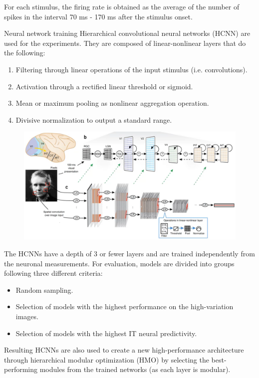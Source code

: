 \begin{casestudy}
\begin{descriptionlist}
            For each stimulus, the firing rate is obtained as the average of the number of spikes in the interval 70 ms - 170 ms after the stimulus onset.


        \item[Neural network training] 
            Hierarchical convolutional neural networks (HCNN) are used for the experiments.
            They are composed of linear-nonlinear layers that do the following:
            \begin{enumerate}
                \item Filtering through linear operations of the input stimulus (i.e. convolutions).
                \item Activation through a rectified linear threshold or sigmoid.
                \item Mean or maximum pooling as nonlinear aggregation operation.
                \item Divisive normalization to output a standard range.
            \end{enumerate}
            \begin{figure}[H]
                \centering
                \includegraphics[width=0.7\linewidth]{./img/vision_nn_network.png}
            \end{figure}

            The HCNNs have a depth of 3 or fewer layers and are trained independently from the neuronal measurements.
            For evaluation, models are divided into groups following three different criteria:
            \begin{itemize}
                \item Random sampling.
                \item Selection of models with the highest performance on the high-variation images.
                \item Selection of models with the highest IT neural predictivity.
            \end{itemize}

            Resulting HCNNs are also used to create a new high-performance architecture through hierarchical modular optimization (HMO)
            by selecting the best-performing modules from the trained networks (as each layer is modular).



\end{descriptionlist}
\end{casestudy}
